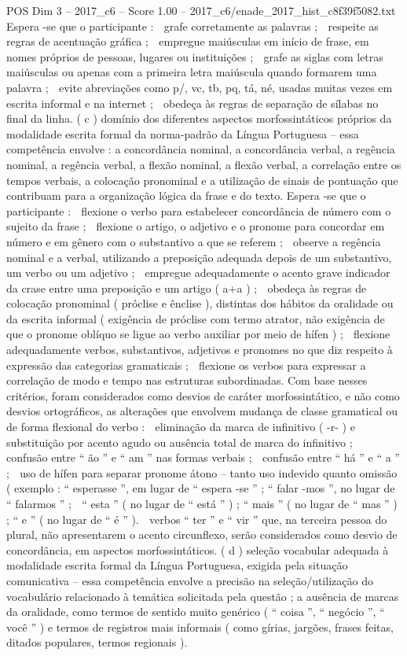 \begin{textsample}{POS Dim 3 – 2017\_c6 – Score 1.00 – 2017\_c6/enade\_2017\_hist\_c8f39f5082.txt}
Espera -se que o participante :  grafe corretamente as palavras ;  respeite as regras de acentuação gráfica ;  empregue maiúsculas em início de frase, em nomes próprios de pessoas, lugares ou instituições ;  grafe as siglas com letras maiúsculas ou apenas com a primeira letra maiúscula quando formarem uma palavra ;  evite abreviações como p/, vc, tb, pq, tá, né, usadas muitas vezes em escrita informal e na internet ;  obedeça às regras de separação de sílabas no final da linha. ( c ) domínio dos diferentes aspectos morfossintáticos próprios da modalidade escrita formal da norma-padrão da Língua Portuguesa – essa competência envolve : a concordância nominal, a concordância verbal, a regência nominal, a regência verbal, a flexão nominal, a flexão verbal, a correlação entre os tempos verbais, a colocação pronominal e a utilização de sinais de pontuação que contribuam para a organização lógica da frase e do texto.
Espera -se que o participante :  flexione o verbo para estabelecer concordância de número com o sujeito da frase ;  flexione o artigo, o adjetivo e o pronome para concordar em número e em gênero com o substantivo a que se referem ;  observe a regência nominal e a verbal, utilizando a preposição adequada depois de um substantivo, um verbo ou um adjetivo ;  empregue adequadamente o acento grave indicador da crase entre uma preposição e um artigo ( a+a ) ;  obedeça às regras de colocação pronominal ( próclise e ênclise ), distintas dos hábitos da oralidade ou da escrita informal ( exigência de próclise com termo atrator, não exigência de que o pronome oblíquo se ligue ao verbo auxiliar por meio de hífen ) ;  flexione adequadamente verbos, substantivos, adjetivos e pronomes no que diz respeito à expressão das categorias gramaticais ;  flexione os verbos para expressar a correlação de modo e tempo nas estruturas subordinadas.
Com base nesses critérios, foram considerados como desvios de caráter morfossintático, e não como desvios ortográficos, as alterações que envolvem mudança de classe gramatical ou de forma flexional do verbo :  eliminação da marca de infinitivo ( -r- ) e substituição por acento agudo ou ausência total de marca do infinitivo ;  confusão entre “ ão ” e “ am ” nas formas verbais ;  confusão entre “ há ” e “ a ” ;  uso de hífen para separar pronome átono – tanto uso indevido quanto omissão ( exemplo : “ esperasse ”, em lugar de “ espera -se ” ; “ falar -mos ”, no lugar de “ falarmos ” ;  “ esta ” ( no lugar de “ está ” ) ; “ mais ” ( no lugar de “ mas ” ) ; “ e ” ( no lugar de “ é ” ).  verbos “ ter ” e “ vir ” que, na terceira pessoa do plural, não apresentarem o acento circunflexo, serão considerados como desvio de concordância, em aspectos morfossintáticos. ( d ) seleção vocabular adequada à modalidade escrita formal da Língua Portuguesa, exigida pela situação comunicativa – essa competência envolve a precisão na seleção/utilização do vocabulário relacionado à temática solicitada pela questão ; a ausência de marcas da oralidade, como termos de sentido muito genérico ( “ coisa ”, “ negócio ”, “ você ” ) e termos de registros mais informais ( como gírias, jargões, frases feitas, ditados populares, termos regionais ).

\end{textsample}
